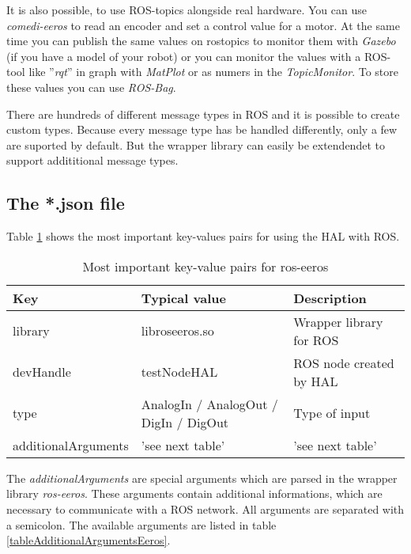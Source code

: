 It is also possible, to use ROS-topics alongside real hardware.
You can use \textit{comedi-eeros} to read an encoder and set a control value for a motor.
At the same time you can publish the same values on rostopics to monitor them with \textit{Gazebo} (if you have a model of your robot) or you can monitor the values with a ROS-tool like ''\textit{rqt}'' in graph with \textit{MatPlot} or as numers in the \textit{TopicMonitor}.
To store these values you can use \textit{ROS-Bag}.

There are hundreds of different message types in ROS and it is possible to create custom types.
Because every message type has be handled differently, only a few are suported by default.
But the wrapper library can easily be extendendet to support addititional message types.

\subsection{The *.json file}
Table \ref{tableKeyValueEeros} shows the most important key-values pairs for using the HAL with ROS.

\begin{table}[]
\centering
\caption{Most important key-value pairs for ros-eeros}
\label{tableKeyValueEeros}
\begin{tabular}{@{}lll@{}}
\toprule
Key                 & Typical value                         & Description              \\ \midrule
library             & libroseeros.so                        & Wrapper library  for ROS \\
devHandle           & testNodeHAL                           & ROS node created by HAL  \\
type                & AnalogIn / AnalogOut / DigIn / DigOut & Type of input            \\ 
additionalArguments & 'see next table'                      & 'see next table'         \\ \bottomrule
\end{tabular}
\end{table}

The \textit{additionalArguments} are special arguments which are parsed in the wrapper library \textit{ros-eeros}.
These arguments contain additional informations, which are necessary to communicate with a ROS network.
All arguments are separated with a semicolon.
The available arguments are listed in table \ref{tableAdditionalArgumentsEeros}.

